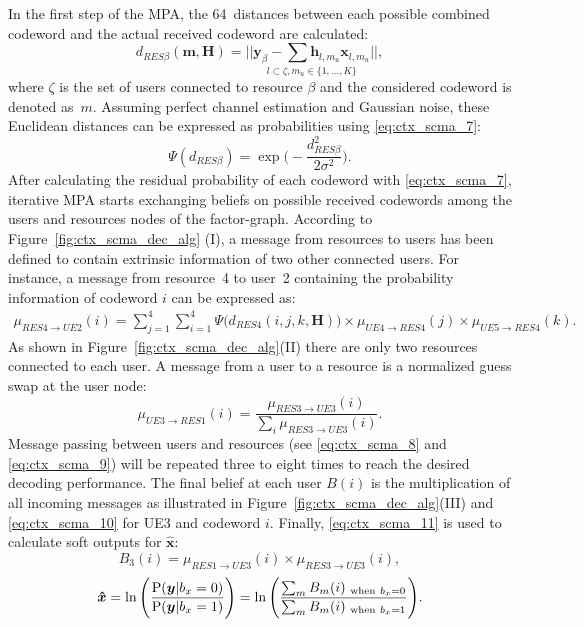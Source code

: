 In the first step of the MPA, the 64~distances between each possible
combined codeword and the actual received codeword are calculated:
\begin{equation}
  \label{eq:ctx_scma_5}
  d_{RES  \beta}(\bm{m}, \bm{H}) =
  \underset{l \subset \zeta, m_u\in\{1,...,K\}}{||\bm{y}_\beta -
  \sum \bm{h}_{l,m_u} \bm{x}_{l,m_u} ||},
\end{equation}
where $\zeta$ is the set of users connected to resource $\beta$ and the
considered codeword is denoted as~$m$. Assuming perfect channel estimation and
Gaussian noise, these Euclidean distances can be expressed as probabilities
using \eqref{eq:ctx_scma_7}:
\begin{equation}
  \label{eq:ctx_scma_7}
  \Psi(d_{RES \beta}) = \exp \Bigg(-\frac{d_{RES \beta}^2}{2\sigma^2} \Bigg).
\end{equation}
After calculating the residual probability of each codeword with
\eqref{eq:ctx_scma_7}, iterative MPA starts exchanging beliefs on possible
received codewords among the users and resources nodes of the factor-graph.
According to Figure~\ref{fig:ctx_scma_dec_alg} (I), a message from resources to
users has been defined to contain extrinsic information of two other connected
users. For instance, a message from resource~4 to user~2 containing the
probability information of codeword $i$ can be expressed as:
\begin{equation}
  \label{eq:ctx_scma_8}
  \begin{split}
  \mu_{RES4 \rightarrow UE2}(i) = \sum\limits_{j=1}^4 \sum\limits_{i=1}^4 \Psi
  \Big(d_{RES4}(i,j,k,\bm{H}) \Big)
  \times \mu_{UE4 \rightarrow RES4}(j) \times \mu_{UE5 \rightarrow RES4}(k).
  \end{split}
\end{equation}
As shown in Figure~\ref{fig:ctx_scma_dec_alg}(II) there are only two resources
connected to each user. A message from a user to a resource is a normalized
guess swap at the user node:
\begin{equation}
  \label{eq:ctx_scma_9}
  \mu_{UE3 \rightarrow RES1}(i) = \frac{\mu_{RES3 \rightarrow UE3}(i)}
  {\sum_i\mu_{RES3 \rightarrow UE3}(i)}.
\end{equation}
Message passing between users and resources (see \eqref{eq:ctx_scma_8} and
\eqref{eq:ctx_scma_9}) will be repeated three to eight times to reach the
desired decoding performance. The final belief at each user $B(i)$ is the
multiplication of all incoming messages as illustrated in
Figure~{\ref{fig:ctx_scma_dec_alg}}(III) and \eqref{eq:ctx_scma_10} for UE3 and
codeword $i$. Finally, \eqref{eq:ctx_scma_11} is used to calculate soft outputs
for $\bm{\hat{x}}$:
\begin{equation}
  \label{eq:ctx_scma_10}
  B_3(i) = \mu_{RES1 \rightarrow UE3}(i) \times \mu_{RES3 \rightarrow UE3}(i),
\end{equation}
\begin{equation}
  \label{eq:ctx_scma_11}
  \bm{\hat{x}} = \ln \Bigg( \frac{\operatorname{P}(\bm{y}|b_x=0)}{\operatorname{P}(\bm{y}|b_x=1)} \Bigg) =
  \ln \Bigg( \frac{\sum_m B_m(i)_{~\text{when}~b_x=0}}{\sum_m B_m(i)_{~\text{when}~b_x=1}}
  \Bigg).
\end{equation}

